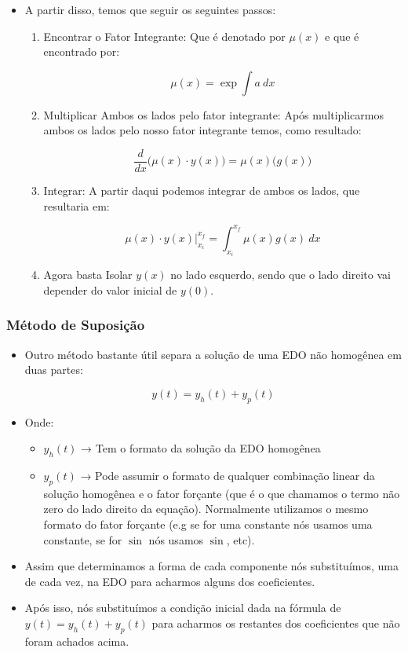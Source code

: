 \documentclass[]{article}
\providecommand{\tightlist}{%
  \setlength{\itemsep}{0pt}\setlength{\parskip}{0pt}}
\begin{document}
  \begin{itemize}
  \tightlist
  \item
    A partir disso, temos que seguir os seguintes passos:

    \begin{enumerate}
    \def\labelenumi{\arabic{enumi}.}
    \item
      Encontrar o Fator Integrante: Que é denotado por \(\mu(x)\) e que é
      encontrado por:

      \[
      \mu(x) = \exp \int a \  dx
      \]
    \item
      Multiplicar Ambos os lados pelo fator integrante: Após
      multiplicarmos ambos os lados pelo nosso fator integrante temos,
      como resultado:

      \[
      \frac{d}{dx}\big(\mu(x)\cdot y(x)\big) = \mu(x) \big(g(x)\big)
      \]
    \item
      Integrar: A partir daqui podemos integrar de ambos os lados, que
      resultaria em:

      \[
      \mu(x)\cdot y(x) \big |^{x_f}_{x_i} = \int^{x_f}_{x_i}\mu(x)g(x) \ dx
      \]
    \item
      Agora basta Isolar \(y(x)\) no lado esquerdo, sendo que o lado
      direito vai depender do valor inicial de \(y(0)\).
    \end{enumerate}
  \end{itemize}

  \hypertarget{muxe9todo-de-suposiuxe7uxe3o}{%
  \subsubsection{Método de Suposição}\label{muxe9todo-de-suposiuxe7uxe3o}}

  \begin{itemize}
  \item
    Outro método bastante útil separa a solução de uma EDO não homogênea
    em duas partes:

    \[
      y(t) = y_h(t) + y_p(t)
      \]
  \item
    Onde:

    \begin{itemize}
    \tightlist
    \item
      \(y_h(t)\) → Tem o formato da solução da EDO homogênea
    \item
      \(y_p(t)\) → Pode assumir o formato de qualquer combinação linear da
      solução homogênea e o fator forçante (que é o que chamamos o termo
      não zero do lado direito da equação). Normalmente utilizamos o mesmo
      formato do fator forçante (e.g se for uma constante nós usamos uma
      constante, se for \(\sin\) nós usamos \(\sin\), etc).
    \end{itemize}
  \item
    Assim que determinamos a forma de cada componente nós substituímos,
    uma de cada vez, na EDO para acharmos alguns dos coeficientes.
  \item
    Após isso, nós substituímos a condição inicial dada na fórmula de
    \(y(t) = y_h(t) + y_p(t)\) para acharmos os restantes dos coeficientes
    que não foram achados acima.
  \end{itemize}
\end{document}

